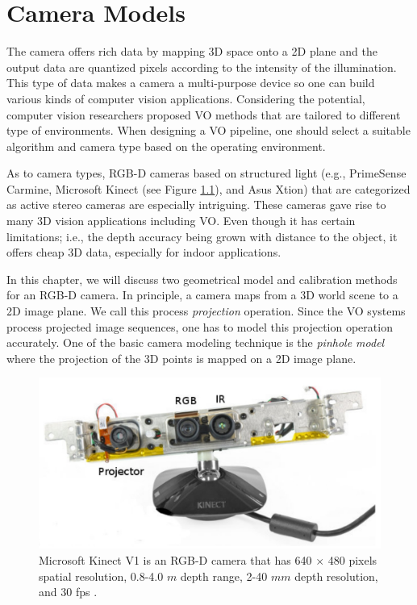 \documentclass[a4paper]{report}
\numberwithin{figure}{section}
\begin{document}


\chapter{Camera Models} \label{cp_cam_models}

The camera offers rich data by mapping 3D
space onto a 2D plane and the output data are quantized pixels according to the
intensity of the illumination.  This type of data makes a camera a
multi-purpose device so one can build various kinds of computer vision
applications.  Considering the potential, computer vision researchers proposed
VO methods that are tailored to different type of environments.  When
designing a VO pipeline, one should select a suitable algorithm and camera type
based on the operating environment.

As to camera types, RGB-D cameras based on structured light (e.g., PrimeSense
Carmine, Microsoft Kinect (see Figure \ref{fig:kinect_pic}), and Asus Xtion) 
that are categorized as active
stereo cameras are especially intriguing.  These cameras gave rise to many 3D
vision applications including VO. Even though it has certain limitations; i.e.,
the depth accuracy being grown with distance to the object, it offers cheap 3D 
data, especially for
indoor applications. 


In this chapter, we will discuss two geometrical model and calibration methods
for an RGB-D camera.  In principle, a camera maps from a 3D world scene to a 2D
image plane. We call this process \textit{projection} operation. Since the VO
systems process projected image sequences, one has to model this projection
operation accurately. One of the basic camera modeling technique is the
\textit{pinhole model} where the projection of the 3D points is mapped on a 2D
image plane.  

\begin{figure}[H]
	\centering
	\includegraphics[width=0.65\linewidth,natwidth=640,natheight=640]
	{fig/ref_imgs/kinect_pic.png}
  \caption[Microsoft Kinect V1]{Microsoft Kinect V1 is an RGB-D camera that 
  has 
  640 $\times$ 480 pixels spatial resolution, 0.8-4.0 $m$ depth range, 2-40 
  $mm$ depth resolution, and 30 fps \parencite{Smisek2011}.}
	\label{fig:kinect_pic}
\end{figure}
\end{document}
